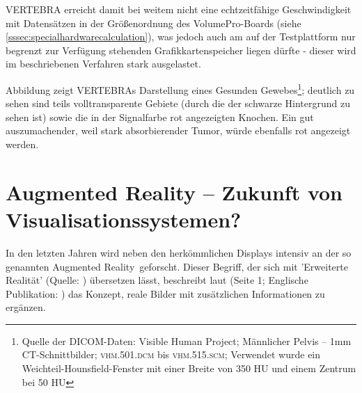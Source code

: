 \documentclass[ngerman,pdftex,paper=A4,DIV=calc,titlepage,12pt]{scrartcl}
\newtheorem[L]{boxedDefinition}{Definition}
\begin{document}
VERTEBRA erreicht damit bei weitem nicht eine echtzeitfähige Geschwindigkeit mit Datensätzen in der Größenordnung des VolumePro-Boards (siehe \ref{sssec:specialhardwarecalculation}), was jedoch auch am auf der Testplattform nur begrenzt zur Verfügung stehenden Grafikkartenspeicher liegen dürfte - dieser wird im beschriebenen Verfahren stark ausgelastet.

Abbildung  zeigt VERTEBRAs Darstellung eines Gesunden Gewebes\footnote{Quelle der DICOM-Daten: Visible Human Project; Männlicher Pelvis -- 1mm CT-Schnittbilder; \textsc{vhm.501.dcm} bis \textsc{vhm.515.scm}; Verwendet wurde ein Weichteil-Hounsfield-Fenster mit einer Breite von 350 HU und einem Zentrum bei 50 HU}; deutlich zu sehen sind teils volltransparente Gebiete (durch die der schwarze Hintergrund zu sehen ist) sowie die in der Signalfarbe rot angezeigten Knochen. Ein gut auszumachender, weil stark absorbierender Tumor, würde ebenfalls rot angezeigt werden.
\enlargethispage{2\baselineskip}

\section{Augmented Reality -- Zukunft von Visualisationssystemen?}\label{sec:augmentedreality}
In den letzten Jahren wird neben den herkömmlichen Displays intensiv an der so genannten \glqq Augmented Reality\grqq\ geforscht. Dieser Begriff, der sich mit 'Erweiterte Realität' (Quelle: \cite[Seite 1]{Toe2010}) übersetzen lässt, beschreibt laut \cite{Suthau2002DE} (Seite 1; Englische Publikation: \cite{Suthau2002}) das Konzept, reale Bilder mit zusätzlichen Informationen zu ergänzen.
\end{document}
